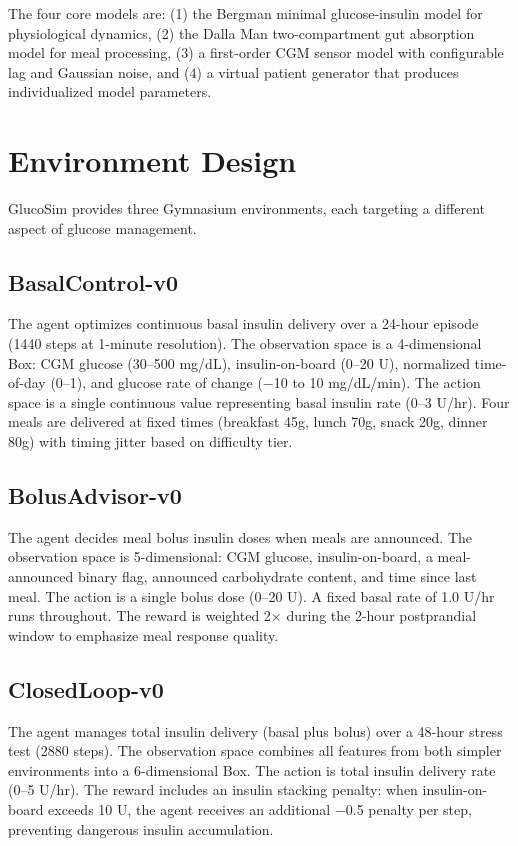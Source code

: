 \documentclass[11pt]{article}
\begin{document}
The four core models are: (1) the Bergman minimal glucose-insulin model for physiological dynamics, (2) the Dalla Man two-compartment gut absorption model for meal processing, (3) a first-order CGM sensor model with configurable lag and Gaussian noise, and (4) a virtual patient generator that produces individualized model parameters.

\section{Environment Design}

GlucoSim provides three Gymnasium environments, each targeting a different aspect of glucose management.

\subsection{BasalControl-v0}

The agent optimizes continuous basal insulin delivery over a 24-hour episode (1440 steps at 1-minute resolution). The observation space is a 4-dimensional Box: CGM glucose (30--500 mg/dL), insulin-on-board (0--20 U), normalized time-of-day (0--1), and glucose rate of change ($-$10 to 10 mg/dL/min). The action space is a single continuous value representing basal insulin rate (0--3 U/hr). Four meals are delivered at fixed times (breakfast 45g, lunch 70g, snack 20g, dinner 80g) with timing jitter based on difficulty tier.

\subsection{BolusAdvisor-v0}

The agent decides meal bolus insulin doses when meals are announced. The observation space is 5-dimensional: CGM glucose, insulin-on-board, a meal-announced binary flag, announced carbohydrate content, and time since last meal. The action is a single bolus dose (0--20 U). A fixed basal rate of 1.0 U/hr runs throughout. The reward is weighted 2$\times$ during the 2-hour postprandial window to emphasize meal response quality.

\subsection{ClosedLoop-v0}

The agent manages total insulin delivery (basal plus bolus) over a 48-hour stress test (2880 steps). The observation space combines all features from both simpler environments into a 6-dimensional Box. The action is total insulin delivery rate (0--5 U/hr). The reward includes an insulin stacking penalty: when insulin-on-board exceeds 10 U, the agent receives an additional $-$0.5 penalty per step, preventing dangerous insulin accumulation.
\end{document}
